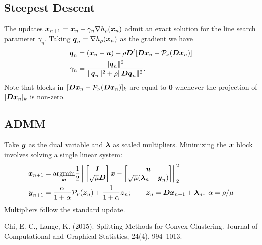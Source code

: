 \documentclass[11pt]{article}
\begin{document}
\subsection*{Steepest Descent}

The updates $\boldsymbol{x}_{n+1} = \boldsymbol{x}_{n} - \gamma_{n} \nabla h_{\rho}(\boldsymbol{x}_{n})$ admit an exact solution for the line search parameter $\gamma_{n}$.
Taking $\boldsymbol{q}_{n} = \nabla h_{\rho}(\boldsymbol{x}_{n})$ as the gradient we have
\begin{align*}
  \boldsymbol{q}_{n}
  &= (\boldsymbol{x}_{n} - \boldsymbol{u}) + \rho \boldsymbol{D}^{t} [\boldsymbol{D} \boldsymbol{x}_{n} - \mathcal{P}_{\nu}(\boldsymbol{D} \boldsymbol{x}_{n})] \\
  \gamma_{n}
  &=
  \frac{\|\boldsymbol{q}_{n}\|^{2}}{\|\boldsymbol{q}_{n}\|^{2} + \rho \|\boldsymbol{D} \boldsymbol{q}_{n}\|^{2}}.
\end{align*}
Note that blocks in $[\boldsymbol{D} \boldsymbol{x}_{n} - \mathcal{P}_{\nu}(\boldsymbol{D}\boldsymbol{x}_{n})]_{k}$ are equal to $\boldsymbol{0}$ whenever the projection of $[\boldsymbol{D} \boldsymbol{x}_{n}]_{k}$ is non-zero.

\subsection*{ADMM}

Take $\boldsymbol{y}$ as the dual variable and $\boldsymbol{\lambda}$ as scaled multipliers.
Minimizing the $\boldsymbol{x}$ block involves solving a single linear system:
\begin{align*}
    \boldsymbol{x}_{n+1}
    &=
    \underset{\boldsymbol{x}}{\mathop{\rm argmin}\nolimits} \frac{1}{2} \left\|
        \begin{bmatrix}
        \boldsymbol{I} \\
        \sqrt{\mu} \boldsymbol{D}
        \end{bmatrix} \boldsymbol{x}
        -
        \begin{bmatrix}
        \boldsymbol{u} \\
        \sqrt{\mu} (\boldsymbol{\lambda}_{n} - \boldsymbol{y}_{n})
        \end{bmatrix}
    \right\|_{2}^{2} \\
    \boldsymbol{y}_{n+1}
    &= \frac{\alpha}{1+\alpha} \mathcal{P}_{\nu}(\boldsymbol{z}_{n}) + \frac{1}{1+\alpha} \boldsymbol{z}_{n};
    \qquad \boldsymbol{z}_{n} = \boldsymbol{D} \boldsymbol{x}_{n+1} + \boldsymbol{\lambda}_{n},~\alpha = \rho / \mu
    \end{align*}
Multipliers follow the standard update.

\begin{thebibliography}{1}
    Chi, E. C., Lange, K. (2015). {Splitting Methods for Convex Clustering}. {Journal of Computational and Graphical Statistics}, 24(4), 994–1013.
\end{thebibliography}
\end{document}
